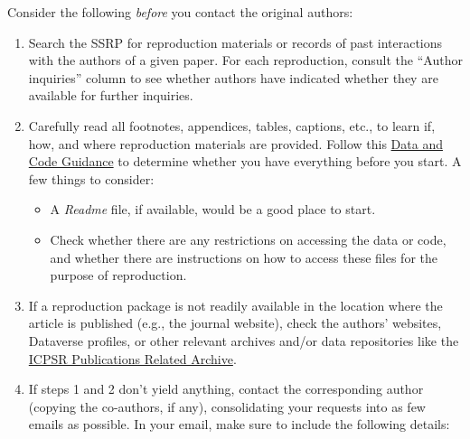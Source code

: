 \documentclass[
]{book}
\providecommand{\tightlist}{%
  \setlength{\itemsep}{0pt}\setlength{\parskip}{0pt}}
\begin{document}
Consider the following \emph{before} you contact the original authors:

\begin{enumerate}
\def\labelenumi{\arabic{enumi}.}
\item
  Search the SSRP for reproduction materials or records of past interactions with the authors of a given paper. For each reproduction, consult the ``Author inquiries'' column to see whether authors have indicated whether they are available for further inquiries.
\item
  Carefully read all footnotes, appendices, tables, captions, etc., to learn if, how, and where reproduction materials are provided. Follow this \href{https://social-science-data-editors.github.io/guidance/Verification_guidance.html}{Data and Code Guidance} to determine whether you have everything before you start. A few things to consider:

  \begin{itemize}
  \tightlist
  \item
    A \emph{Readme} file, if available, would be a good place to start.\\
  \item
    Check whether there are any restrictions on accessing the data or code, and whether there are instructions on how to access these files for the purpose of reproduction.
  \end{itemize}
\item
  If a reproduction package is not readily available in the location where the article is published (e.g., the journal website), check the authors' websites, Dataverse profiles, or other relevant archives and/or data repositories like the \href{https://www.icpsr.umich.edu/icpsrweb/}{ICPSR Publications Related Archive}.
\item
  If steps 1 and 2 don't yield anything, contact the corresponding author (copying the co-authors, if any), consolidating your requests into as few emails as possible. In your email, make sure to include the following details:


\end{enumerate}
\end{document}
